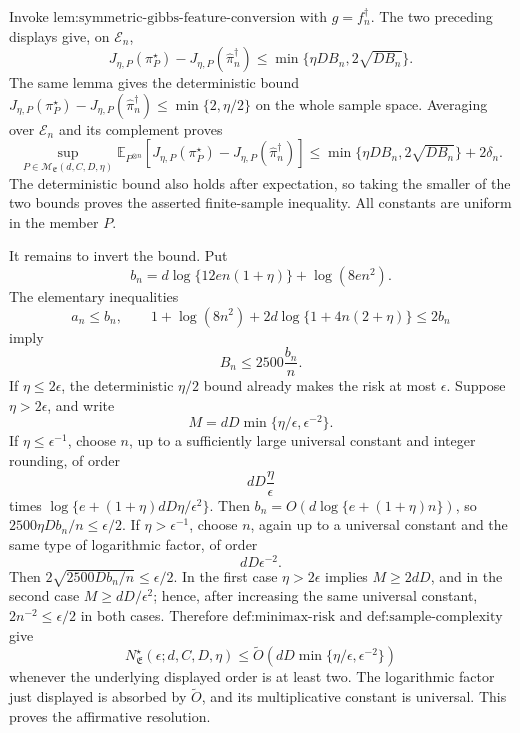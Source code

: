 Invoke \(\text{lem:symmetric-gibbs-feature-conversion}\) with \(g=f_n^\dagger\). The two preceding displays give, on \(\mathcal E_n\),
\[
J_{\eta,P}(\pi_P^\star)-J_{\eta,P}(\widehat\pi_n^\dagger)
\le\min\{\eta DB_n,2\sqrt{DB_n}\}.
\]
The same lemma gives the deterministic bound \(J_{\eta,P}(\pi_P^\star)-J_{\eta,P}(\widehat\pi_n^\dagger)\le\min\{2,\eta/2\}\) on the whole sample space. Averaging over \(\mathcal E_n\) and its complement proves
\[
\sup_{P\in\mathcal M_{\mathfrak E}(d,C,D,\eta)}
\mathbb E_{P^{\otimes n}}\!\left[J_{\eta,P}(\pi_P^\star)-J_{\eta,P}(\widehat\pi_n^\dagger)\right]
\le\min\{\eta DB_n,2\sqrt{DB_n}\}+2\delta_n.
\]
The deterministic bound also holds after expectation, so taking the smaller of the two bounds proves the asserted finite-sample inequality. All constants are uniform in the member \(P\).

It remains to invert the bound. Put
\[
b_n=d\log\{12en(1+\eta)\}+\log(8en^2).
\]
The elementary inequalities
\[
a_n\le b_n,
\qquad
1+\log(8n^2)+2d\log\{1+4n(2+\eta)\}\le2b_n
\]
imply
\[
B_n\le2500\frac{b_n}{n}.
\]
If \(\eta\le2\epsilon\), the deterministic \(\eta/2\) bound already makes the risk at most \(\epsilon\). Suppose \(\eta>2\epsilon\), and write
\[
M=dD\min\{\eta/\epsilon,\epsilon^{-2}\}.
\]
If \(\eta\le\epsilon^{-1}\), choose \(n\), up to a sufficiently large universal constant and integer rounding, of order
\[
dD\frac\eta\epsilon
\]
times \(\log\{e+(1+\eta)dD\eta/\epsilon^2\}\). Then \(b_n=O(d\log\{e+(1+\eta)n\})\), so \(2500\eta D b_n/n\le\epsilon/2\). If \(\eta>\epsilon^{-1}\), choose \(n\), again up to a universal constant and the same type of logarithmic factor, of order
\[
dD\epsilon^{-2}.
\]
Then \(2\sqrt{2500D b_n/n}\le\epsilon/2\). In the first case \(\eta>2\epsilon\) implies \(M\ge2dD\), and in the second case \(M\ge dD/\epsilon^2\); hence, after increasing the same universal constant, \(2n^{-2}\le\epsilon/2\) in both cases. Therefore \(\text{def:minimax-risk}\) and \(\text{def:sample-complexity}\) give
\[
N^\star_{\mathfrak E}(\epsilon;d,C,D,\eta)
\le\widetilde O\!\left(dD\min\{\eta/\epsilon,\epsilon^{-2}\}\right)
\]
whenever the underlying displayed order is at least two. The logarithmic factor just displayed is absorbed by \(\widetilde O\), and its multiplicative constant is universal. This proves the affirmative resolution.